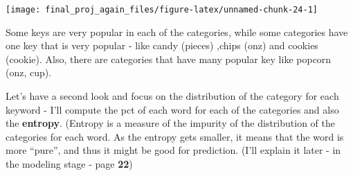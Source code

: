 \documentclass[
]{article}
\begin{document}
\begin{center}\texttt{[image: final\_proj\_again\_files/figure-latex/unnamed-chunk-24-1]} \end{center}

Some keys are very popular in each of the categories, while some
categories have one key that is very popular - like candy (pieces)
,chips (onz) and cookies (cookie). Also, there are categories that have
many popular key like popcorn (onz, cup).

Let's have a second look and focus on the distribution of the category
for each keyword - I'll compute the pct of each word for each of the
categories and also the \textbf{entropy}. (Entropy is a measure of the
impurity of the distribution of the categories for each word. As the
entropy gets smaller, it means that the word is more ``pure'', and thus
it might be good for prediction. (I'll explain it later - in the
modeling stage - page \textbf{22})
\end{document}
